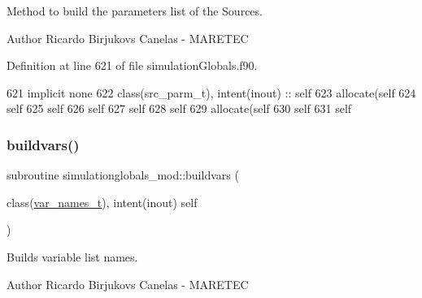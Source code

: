 Method to build the parameters list of the Sources. 

\begin{DoxyAuthor}{Author}
Ricardo Birjukovs Canelas -\/ M\+A\+R\+E\+T\+EC 
\end{DoxyAuthor}


Definition at line 621 of file simulation\+Globals.\+f90.


\begin{DoxyCode}
621     \textcolor{keywordtype}{implicit none}
622     \textcolor{keywordtype}{class}(src\_parm\_t), \textcolor{keywordtype}{intent(inout)} :: self
623     \textcolor{keyword}{allocate}(self%
624     self%
625     self%
626     self%
627     self%
628     self%
629     \textcolor{keyword}{allocate}(self%
630     self%
631     self%
\end{DoxyCode}
\mbox{\label{namespacesimulationglobals__mod_a4aa829af1699c705e46f47bb023ac162}} 
\subsubsection{\texorpdfstring{buildvars()}{buildvars()}}
{\footnotesize\ttfamily subroutine simulationglobals\+\_\+mod\+::buildvars (\begin{DoxyParamCaption}\item[{class(\mbox{\hyperlink{structsimulationglobals__mod_1_1var__names__t}{var\+\_\+names\+\_\+t}}), intent(inout)}]{self }\end{DoxyParamCaption})\hspace{0.3cm}{\ttfamily [private]}}



Builds variable list names. 

\begin{DoxyAuthor}{Author}
Ricardo Birjukovs Canelas -\/ M\+A\+R\+E\+T\+EC 
\end{DoxyAuthor}


